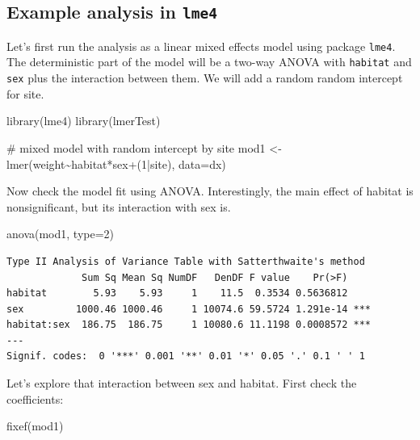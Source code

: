 \documentclass[
  13,
  letterpaper,
]{report}
\newenvironment{Shaded}{\begin{snugshade}}{\end{snugshade}}
\newcommand{\AttributeTok}[1]{\textcolor[rgb]{0.40,0.45,0.13}{#1}}
\newcommand{\CommentTok}[1]{\textcolor[rgb]{0.37,0.37,0.37}{#1}}
\newcommand{\DecValTok}[1]{\textcolor[rgb]{0.68,0.00,0.00}{#1}}
\newcommand{\FunctionTok}[1]{\textcolor[rgb]{0.28,0.35,0.67}{#1}}
\newcommand{\NormalTok}[1]{\textcolor[rgb]{0.00,0.23,0.31}{#1}}
\newcommand{\OtherTok}[1]{\textcolor[rgb]{0.00,0.23,0.31}{#1}}
\newcommand{\SpecialCharTok}[1]{\textcolor[rgb]{0.37,0.37,0.37}{#1}}
\begin{document}
\subsection{\texorpdfstring{Example analysis in
\texttt{lme4}}{Example analysis in lme4}}\label{sec-mixed-lmm-lme4}

Let's first run the analysis as a linear mixed effects model using
package \texttt{lme4}. The deterministic part of the model will be a
two-way ANOVA with \texttt{habitat} and \texttt{sex} plus the
interaction between them. We will add a random random intercept for
site.

\begin{Shaded}
\begin{Highlighting}[]
\FunctionTok{library}\NormalTok{(lme4)}
\FunctionTok{library}\NormalTok{(lmerTest)}

\CommentTok{\# mixed model with random intercept by site}
\NormalTok{mod1 }\OtherTok{\textless{}{-}} \FunctionTok{lmer}\NormalTok{(weight}\SpecialCharTok{\textasciitilde{}}\NormalTok{habitat}\SpecialCharTok{*}\NormalTok{sex}\SpecialCharTok{+}\NormalTok{(}\DecValTok{1}\SpecialCharTok{|}\NormalTok{site), }\AttributeTok{data=}\NormalTok{dx)}
\end{Highlighting}
\end{Shaded}

Now check the model fit using ANOVA. Interestingly, the main effect of
habitat is nonsignificant, but its interaction with sex is.

\begin{Shaded}
\begin{Highlighting}[]
\FunctionTok{anova}\NormalTok{(mod1, }\AttributeTok{type=}\DecValTok{2}\NormalTok{)}
\end{Highlighting}
\end{Shaded}

\begin{verbatim}
Type II Analysis of Variance Table with Satterthwaite's method
             Sum Sq Mean Sq NumDF   DenDF F value    Pr(>F)    
habitat        5.93    5.93     1    11.5  0.3534 0.5636812    
sex         1000.46 1000.46     1 10074.6 59.5724 1.291e-14 ***
habitat:sex  186.75  186.75     1 10080.6 11.1198 0.0008572 ***
---
Signif. codes:  0 '***' 0.001 '**' 0.01 '*' 0.05 '.' 0.1 ' ' 1
\end{verbatim}

Let's explore that interaction between sex and habitat. First check the
coefficients:

\begin{Shaded}
\begin{Highlighting}[]
\FunctionTok{fixef}\NormalTok{(mod1)}
\end{Highlighting}
\end{Shaded}
\end{document}
